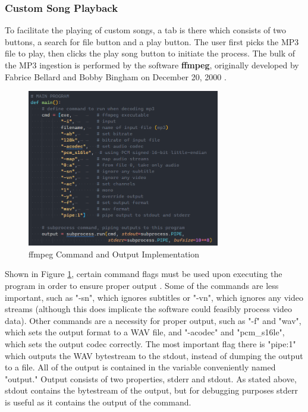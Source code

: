 \documentclass[UTF8, 12pt]{article}
\begin{document}
\subsubsection{Custom Song Playback}
    To facilitate the playing of custom songs, a tab is there which consists of two buttons, a search for file button and a play button. The user first picks the MP3 file to play, then clicks the play song button to initiate the process. The bulk of the MP3 ingestion is performed by the software \textbf{ffmpeg}, originally developed by Fabrice Bellard and Bobby Bingham on December 20, 2000 \cite{ffmpeg}. 
    \begin{figure}[h]
        \centering
        \includegraphics[width=0.75\textwidth]{ffmpeg_code}
        \caption{ffmpeg Command and Output Implementation}
        \label{ff_code}
    \end{figure}
    Shown in Figure \ref{ff_code}, certain command flags must be used upon executing the program in order to ensure proper output \cite{ffmpeg}. Some of the commands are less important, such as "-sn", which ignores subtitles or "-vn", which ignores any video streams (although this does implicate the software could feasibly process video data). Other commands are a necessity for proper output, such as "-f" and "wav", which sets the output format to a WAV file, and "-acodec" and "pcm\_s16le", which sets the output codec correctly. The most important flag there is "pipe:1" which outputs the WAV bytestream to the stdout, instead of dumping the output to a file. All of the output is contained in the variable conveniently named "output." Output consists of two properties, stderr and stdout. As stated above, stdout contains the bytestream of the output, but for debugging purposes stderr is useful as it contains the output of the command.
\end{document}
